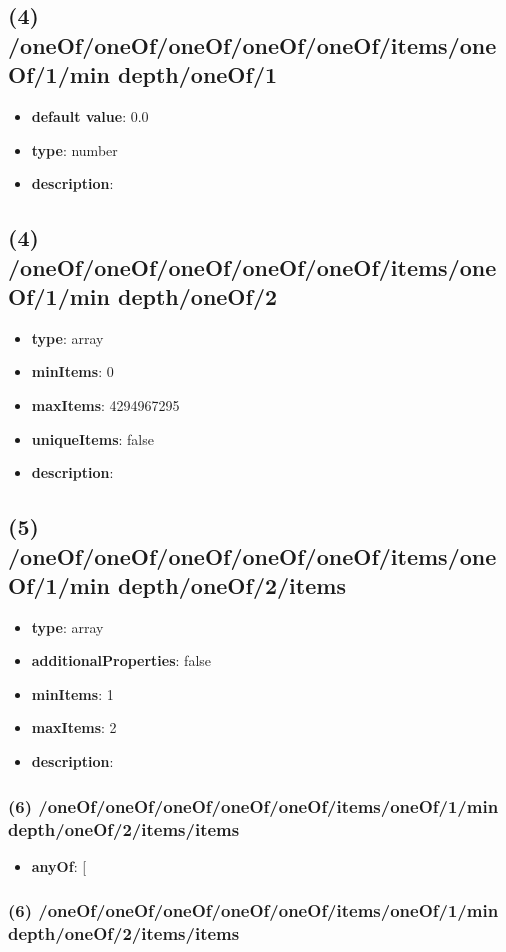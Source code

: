 \subsection{(4) /oneOf/oneOf/oneOf/oneOf/oneOf/items/oneOf/1/min depth/oneOf/1}
\begin{itemize}[leftmargin=4em]\item {\bf default value}: 0.0
\item {\bf type}: number
\item {\bf description}: 
\end{itemize}\subsection{(4) /oneOf/oneOf/oneOf/oneOf/oneOf/items/oneOf/1/min depth/oneOf/2}
\begin{itemize}[leftmargin=4em]\item {\bf type}: array
\item {\bf minItems}: 0
\item {\bf maxItems}: 4294967295
\item {\bf uniqueItems}: false
\item {\bf description}: 
\end{itemize}\subsection{(5) /oneOf/oneOf/oneOf/oneOf/oneOf/items/oneOf/1/min depth/oneOf/2/items}
\begin{itemize}[leftmargin=5em]\item {\bf type}: array
\item {\bf additionalProperties}: false
\item {\bf minItems}: 1
\item {\bf maxItems}: 2
\item {\bf description}: 
\end{itemize}\subsubsection{(6) /oneOf/oneOf/oneOf/oneOf/oneOf/items/oneOf/1/min depth/oneOf/2/items/items}
\begin{itemize}[leftmargin=6em]\item {\bf anyOf}: [\end{itemize}\subsubsection{(6) /oneOf/oneOf/oneOf/oneOf/oneOf/items/oneOf/1/min depth/oneOf/2/items/items}
